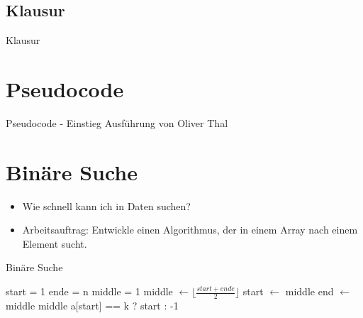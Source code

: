 \documentclass[18pt]{beamer}
\begin{document}
\subsection{Klausur}
\begin{frame}{Klausur}
 
\end{frame}


\section{Pseudocode}
\begin{frame}{Pseudocode - Einstieg}
 Ausführung von Oliver Thal
\end{frame}

\section{Binäre Suche}
\begin{frame}
 \begin{itemize}
  \item Wie schnell kann ich in Daten suchen?
  \item Arbeitsauftrag: Entwickle einen Algorithmus, der in einem Array nach einem Element sucht.
 \end{itemize}

\end{frame}

\begin{frame}[fragile]{Binäre Suche}
 \begin{algorithmic}
    \State start = 1
    \State ende = n
    \State middle = 1
      \State middle $\gets\lfloor \frac{start + ende}{2} \rfloor$
	\State start $\gets$ middle
        \State end $\gets$ middle
      \Else
        \State \Return middle
      \EndIf
    \EndWhile
    \State \Return a[start] == k ? start : -1
  \EndFunction
 \end{algorithmic}
\end{frame}
\end{document}
